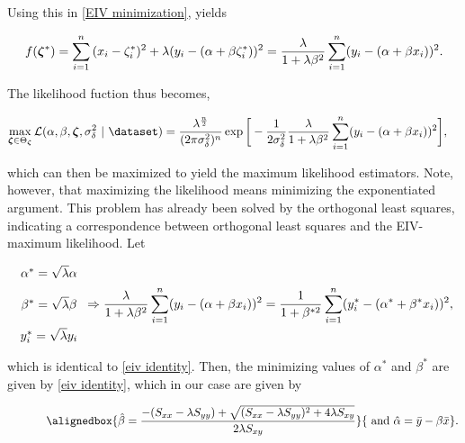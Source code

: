 \documentclass{homework}
\begin{document}
Using this in \eqref{EIV minimization}, yields 

\begin{align*}
    f(\bm{\zeta}^{*}) = \sum_{i=1}^{n} {(x_i - \zeta_i^{*})^2 + \lambda(y_i - (\alpha + \beta \zeta_i^{*}))^2} = \frac{\lambda}{1+\lambda\beta^2} \sum_{i=1}^{n} (y_i - (\alpha + \beta x_i))^2.
\end{align*}

The likelihood fuction thus becomes,

\begin{align}
    \max_{\bm{\zeta} \in \Theta_{\bm{\zeta}}}
    \mathcal{L}(\alpha, \beta, \bm{\zeta}, \sigma_{\delta}^2 \blank &| \blank \dataset) =        \frac{{\lambda}^{\frac{n}{2}}}{(2\pi\sigma_{\delta}^2 )^{n}} \exp\bigg[- \frac{1}{2\sigma_\delta^2}  \frac{\lambda}{1+\lambda\beta^2} \summation (y_i - (\alpha + \beta x_i))^2\bigg] 
    \label{EIV likelihood 2},
\end{align}

which can then be maximized to yield the maximum likelihood estimators. Note, however, that maximizing the likelihood means minimizing the exponentiated argument. This problem has already been solved by the orthogonal least squares, indicating a correspondence between orthogonal least squares and the EIV-maximum likelihood. Let

\begin{equation}
    \begin{array}{cc}
         \alpha^{*} = \sqrt{\lambda} \alpha\\
         \\
         \beta^{*} =\sqrt{\lambda} \beta \\
         \\
         y_i^{*} = \sqrt{\lambda} y_i 
    \end{array} \Rightarrow  \frac{\lambda}{1+\lambda\beta^2} \sum_{i=1}^{n} (y_i - (\alpha + \beta x_i))^2 =  \frac{1}{1+\beta^{*2}} \sum_{i=1}^{n} (y_i^{*} - (\alpha^{*} + \beta^{*} x_i))^2,
\end{equation}

which is identical to \eqref{eiv identity}. Then, the minimizing values of $\alpha^{*}$ and $\beta^{*}$ are given by \eqref{eiv identity}, which in our case are given by 

\begin{align}
    \blank & \blank & \blank &  \blank &  
    \alignedbox{\hat{\beta} = \frac{-(S_{xx}-\lambda S_{yy}) + \sqrt{(S_{xx}-\lambda S_{yy})^2 + 4 \lambda S_{xy}}}{2\lambda S_{xy}}}{ \textnormal{ and } \hat{\alpha} = \bar{y} - \beta \bar{x}}.
    \label{MLE estimators}
\end{align}
\end{document}
